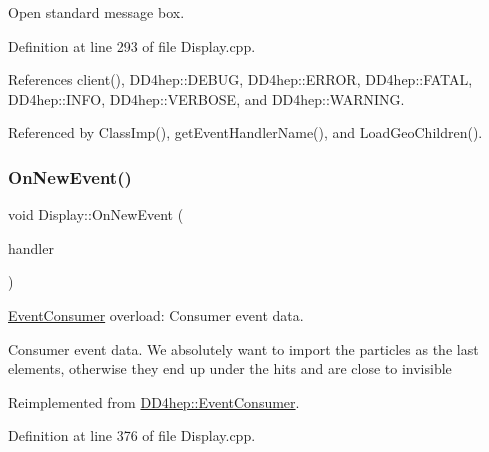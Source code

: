 Open standard message box. 



Definition at line 293 of file Display.\+cpp.



References client(), D\+D4hep\+::\+D\+E\+B\+UG, D\+D4hep\+::\+E\+R\+R\+OR, D\+D4hep\+::\+F\+A\+T\+AL, D\+D4hep\+::\+I\+N\+FO, D\+D4hep\+::\+V\+E\+R\+B\+O\+SE, and D\+D4hep\+::\+W\+A\+R\+N\+I\+NG.



Referenced by Class\+Imp(), get\+Event\+Handler\+Name(), and Load\+Geo\+Children().

\hypertarget{class_d_d4hep_1_1_display_a6bde493af2434cc4d59fa8b6b0e58058}{}\label{class_d_d4hep_1_1_display_a6bde493af2434cc4d59fa8b6b0e58058} 
\subsubsection{\texorpdfstring{On\+New\+Event()}{OnNewEvent()}}
{\footnotesize\ttfamily void Display\+::\+On\+New\+Event (\begin{DoxyParamCaption}\item[{\hyperlink{class_d_d4hep_1_1_event_handler}{Event\+Handler} $\ast$}]{handler }\end{DoxyParamCaption})\hspace{0.3cm}{\ttfamily [virtual]}}



\hyperlink{class_d_d4hep_1_1_event_consumer}{Event\+Consumer} overload\+: Consumer event data. 

Consumer event data. We absolutely want to import the particles as the last elements, otherwise they end up under the hits and are close to invisible 

Reimplemented from \hyperlink{class_d_d4hep_1_1_event_consumer_a755b12d11f8676c4f2957f6a1f26fb31}{D\+D4hep\+::\+Event\+Consumer}.



Definition at line 376 of file Display.\+cpp.



